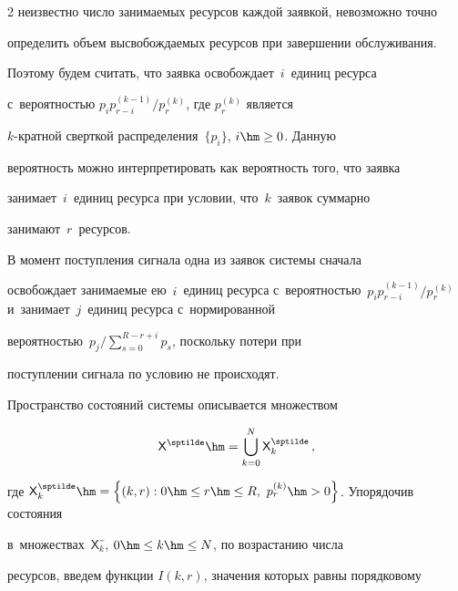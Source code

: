 \begin{multicols}{2}
неизвестно число занимаемых ресурсов каждой заявкой, невозможно точно 

определить объем высвобождаемых ресурсов при завершении обслуживания. 

Поэтому будем считать, что заявка освобождает~$i$~единиц ресурса 

с~вероятностью $p_ip_{r-i}^{(k-1)}/p_r^{(k)}$, где $p_r^{(k)}$ является  

$k$-крат\-ной сверткой распределения~$\{p_i\}$, $i\hm\geq0$. Данную 

вероятность можно интерпретировать как вероятность того, что заявка 

занимает~$i$~единиц ресурса при условии, что~$k$~заявок суммарно 

занимают~$r$~ресурсов. 

  

  В момент поступления сигнала одна из заявок системы сначала 

освобождает занимаемые ею~$i$~единиц ресурса с~вероятностью~$p_i p_{r-

i}^{(k-1)}/p_r^{(k)}$ и~занимает~$j$~единиц ресурса с~нормированной 

вероят\-ностью~$p_j/\sum\nolimits_{s=0}^{R-r+i} p_s$, поскольку потери при 

поступле\-нии сигнала по условию не происходят.

  

  Пространство состояний системы описывается множеством

  

  \noindent

   $$

    \mathsf{X}^{\sptilde} \hm= \mathop{\bigcup}\limits_{k=0}^N 

   {\sf X}_k^{\sptilde}\,,

   $$

   

   \vspace*{-2pt}

   

   \noindent

    где ${\mathsf X}_k^{\sptilde} \hm= \left\{ 

(k,r): 0\hm\leq r\hm\leq R,\ p_r^{(k)}\hm>0\right\}$. Упорядочив состояния 

в~множествах~${\mathsf X}_k^{\sptilde}$, $0\hm\leq k\hm\leq N$, по возрастанию числа 

ресурсов, введем функции $I(k,r)$, значения которых равны порядковому 


\end{multicols}
